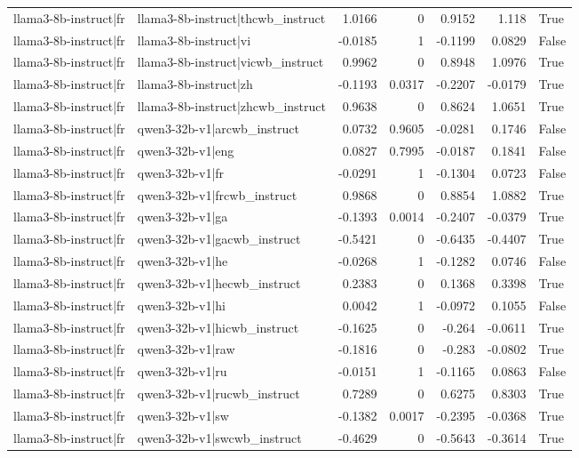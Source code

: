 \begin{table}
\begin{tabular}{l l r r r r l}
llama3-8b-instruct|fr & llama3-8b-instruct|thcwb_instruct & 1.0166 & 0 & 0.9152 & 1.118 & True \\
llama3-8b-instruct|fr & llama3-8b-instruct|vi & -0.0185 & 1 & -0.1199 & 0.0829 & False \\
llama3-8b-instruct|fr & llama3-8b-instruct|vicwb_instruct & 0.9962 & 0 & 0.8948 & 1.0976 & True \\
llama3-8b-instruct|fr & llama3-8b-instruct|zh & -0.1193 & 0.0317 & -0.2207 & -0.0179 & True \\
llama3-8b-instruct|fr & llama3-8b-instruct|zhcwb_instruct & 0.9638 & 0 & 0.8624 & 1.0651 & True \\
llama3-8b-instruct|fr & qwen3-32b-v1|arcwb_instruct & 0.0732 & 0.9605 & -0.0281 & 0.1746 & False \\
llama3-8b-instruct|fr & qwen3-32b-v1|eng & 0.0827 & 0.7995 & -0.0187 & 0.1841 & False \\
llama3-8b-instruct|fr & qwen3-32b-v1|fr & -0.0291 & 1 & -0.1304 & 0.0723 & False \\
llama3-8b-instruct|fr & qwen3-32b-v1|frcwb_instruct & 0.9868 & 0 & 0.8854 & 1.0882 & True \\
llama3-8b-instruct|fr & qwen3-32b-v1|ga & -0.1393 & 0.0014 & -0.2407 & -0.0379 & True \\
llama3-8b-instruct|fr & qwen3-32b-v1|gacwb_instruct & -0.5421 & 0 & -0.6435 & -0.4407 & True \\
llama3-8b-instruct|fr & qwen3-32b-v1|he & -0.0268 & 1 & -0.1282 & 0.0746 & False \\
llama3-8b-instruct|fr & qwen3-32b-v1|hecwb_instruct & 0.2383 & 0 & 0.1368 & 0.3398 & True \\
llama3-8b-instruct|fr & qwen3-32b-v1|hi & 0.0042 & 1 & -0.0972 & 0.1055 & False \\
llama3-8b-instruct|fr & qwen3-32b-v1|hicwb_instruct & -0.1625 & 0 & -0.264 & -0.0611 & True \\
llama3-8b-instruct|fr & qwen3-32b-v1|raw & -0.1816 & 0 & -0.283 & -0.0802 & True \\
llama3-8b-instruct|fr & qwen3-32b-v1|ru & -0.0151 & 1 & -0.1165 & 0.0863 & False \\
llama3-8b-instruct|fr & qwen3-32b-v1|rucwb_instruct & 0.7289 & 0 & 0.6275 & 0.8303 & True \\
llama3-8b-instruct|fr & qwen3-32b-v1|sw & -0.1382 & 0.0017 & -0.2395 & -0.0368 & True \\
llama3-8b-instruct|fr & qwen3-32b-v1|swcwb_instruct & -0.4629 & 0 & -0.5643 & -0.3614 & True \\

\end{tabular}
\end{table}
